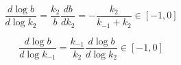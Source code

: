 \documentclass{article}
\begin{document}
	\begin{center}
		\begin{equation}
			\frac{d \log b}{d \log k_2} = \frac{k_2}{b} \frac{d b}{d k_2} = -\frac{k_2}{k_{-1}+k_2} \in \left[-1,0 \right]
		\end{equation}
	\end{center}

	
	\begin{center}
		\begin{equation}
			\frac{d \log b}{d \log k_{-1}} = \frac{k_{-1}}{k_2} \frac{d \log b}{d \log k_2} \in \left[-1,0 \right]
		\end{equation}
	\end{center}
	
\end{document}
